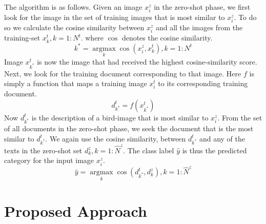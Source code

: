 \documentclass[11pt,a4paper]{article}
\newcommand\gal[1]{\textcolor{bright}{\textbf{GAL:} #1 }}
\begin{document}
The algorithm is as follows. Given an image $x^z_i$ in the zero-shot phase,
we first look for the image in the set of training images that is most similar to $x^z_i$. To do so we calculate the cosine similarity between $x^z_i$  and all the images from the training-set $x^{t}_k, k=1:N^{t}$.
where $\cos$ denotes the cosine similarity.
\begin{equation}
{k}^*= \operatorname*{argmax}_{k}\cos(x_i^{z},x^{t}_k), k = 1:N^{t}
\end{equation}
Image $x_{k^*}^{t}$ is now the image that had received the highest cosine-similarity score. Next, we look for the training  document corresponding to that image. Here $f$ is simply a function that maps  a training image $x_i^{t}$ to its corresponding training document.
\begin{equation}
d^{t}_{k^*}=f(x^{t}_{k^*}) 
\end{equation}
Now \(d^{t}_{k^*}\) is the description of a bird-image that is most similar to \(x_i^{z}\). From the set of all documents in the zero-shot phase, we seek the document that is the most similar to $d_{k^*}^{t}$.
We again use
 the cosine similarity, between $d_{k^*}^{t}$ and any of  the texts in the zero-shot set $d^{z}_k, k = 1 : \hat{N}^{z}$.
 The class label  $\hat{y}$ is thus the predicted category for the input image $x^{z}_i$.
\begin{equation}
\hat{y}= \operatorname*{argmax}_{k}\cos(d^{t}_{k^*},d^{z}_{k}), k = 1 : \hat{N}^{z}
\end{equation}



%
%




\section{Proposed Approach}
\end{document}
